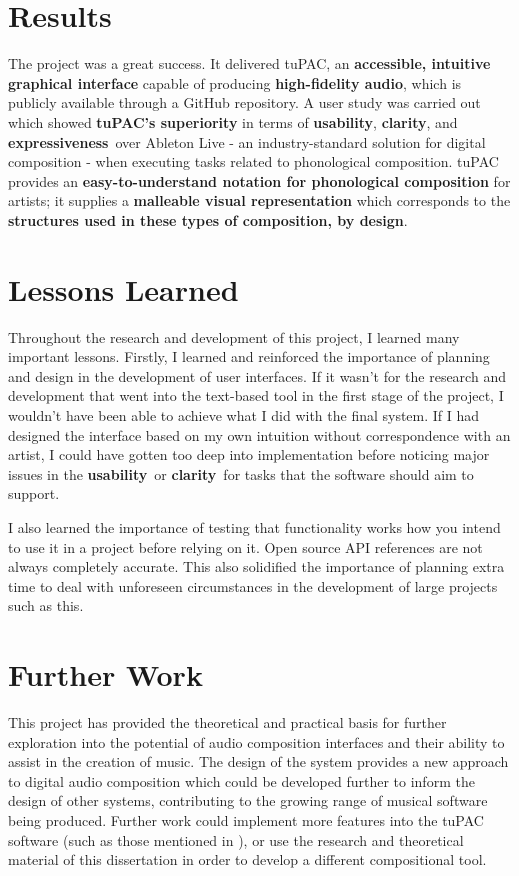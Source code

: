 \documentclass[12pt,a4paper,oneside,openright]{report}
\newcommand{\usability}{\textbf{usability}}
\newcommand{\clarity}{\textbf{clarity}}
\newcommand{\expressiveness}{\textbf{expressiveness}}
\begin{document}
\section{Results}
The project was a great success. It delivered tuPAC, an \textbf{accessible, intuitive graphical interface} capable of producing \textbf{high-fidelity audio}, which is publicly available through a GitHub repository. A user study was carried out which showed \textbf{tuPAC's superiority} in terms of \usability, \clarity, and \expressiveness\ over Ableton Live - an industry-standard solution for digital composition - when executing tasks related to phonological composition. tuPAC provides an \textbf{easy-to-understand notation for phonological composition} for artists; it supplies a \textbf{malleable visual representation} which corresponds to the \textbf{structures used in these types of composition, by design}.

\section{Lessons Learned}
Throughout the research and development of this project, I learned many important lessons. Firstly, I learned and reinforced the importance of planning and design in the development of user interfaces. If it wasn't for the research and development that went into the text-based tool in the first stage of the project, I wouldn't have been able to achieve what I did with the final system. If I had designed the interface based on my own intuition without correspondence with an artist, I could have gotten too deep into implementation before noticing major issues in the \usability\ or \clarity\ for tasks that the software should aim to support. 

I also learned the importance of testing that functionality works how you intend to use it in a project before relying on it. Open source API references are not always completely accurate. This also solidified the importance of planning extra time to deal with unforeseen circumstances in the development of large projects such as this.

\section{Further Work}
This project has provided the theoretical and practical basis for further exploration into the potential of audio composition interfaces and their ability to assist in the creation of music. The design of the system provides a new approach to digital audio composition which could be developed further to inform the design of other systems, contributing to the growing range of musical software being produced. Further work could implement more features into the tuPAC software (such as those mentioned in ), or use the research and theoretical material of this dissertation in order to develop a different compositional tool.
\end{document}
